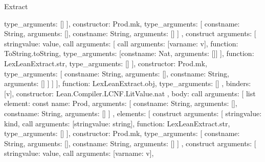 \begin{lexlean}{Extract}
\begin{toolingmodule}
{{{{{{{{                          type_arguments: []
                        }
                      ],
                      constructor: Prod.mk,
                      type_arguments: [
                        const{name: String, arguments: []},
                        const{name: String, arguments: []}
                      ]
                    },
                    construct{
                      arguments: [
                        string{value: value},
                        call{
                          arguments: [
                            call{
                              arguments: [var{name: v}],
                              function: ToString.toString,
                              type_arguments: [const{name: Nat, arguments: []}]
                            }
                          ],
                          function: LexLeanExtract.str,
                          type_arguments: []
                        }
                      ],
                      constructor: Prod.mk,
                      type_arguments: [
                        const{name: String, arguments: []},
                        const{name: String, arguments: []}
                      ]
                    }
                  ]
                }
              ],
              function: LexLeanExtract.obj,
              type_arguments: []
            },
            binders: [v],
            constructor: Lean.Compiler.LCNF.LitValue.nat
          },
          {
            body: call{
              arguments: [
                list{
                  element: const{
                    name: Prod,
                    arguments: [
                      const{name: String, arguments: []},
                      const{name: String, arguments: []}
                    ]
                  },
                  elements: [
                    construct{
                      arguments: [
                        string{value: kind},
                        call{
                          arguments: [string{value: string}],
                          function: LexLeanExtract.str,
                          type_arguments: []
                        }
                      ],
                      constructor: Prod.mk,
                      type_arguments: [
                        const{name: String, arguments: []},
                        const{name: String, arguments: []}
                      ]
                    },
                    construct{
                      arguments: [
                        string{value: value},
                        call{
                          arguments: [var{name: v}],
}}}}}}}}
\end{toolingmodule}
\end{lexlean}
